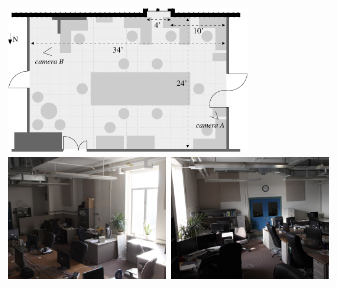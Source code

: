 \documentclass{article}
\begin{document}
\begin{figure}[t]
\centering
\includegraphics[width=2.5in]{../gi2012_userstudy/images/lab.pdf} \vspace{0.1in}
\\
\includegraphics[width=1.65in]{../gi2012_userstudy/images/photos/camera_angle_2_lights_off.jpg}
\includegraphics[width=1.65in]{../gi2012_userstudy/images/photos/camera_angle_3_lights_off.jpg}\vspace{-0.19in}\\
\begin{minipage}{1.65in}~{\color{white}{\em camera A}}\end{minipage}
\begin{minipage}{1.65in}~{\color{white}{\em camera B}}\end{minipage}\vspace{0.0in}\\

\end{figure}
\end{document}
